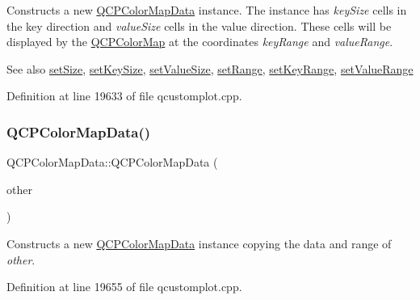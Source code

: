 Constructs a new \hyperlink{class_q_c_p_color_map_data}{Q\+C\+P\+Color\+Map\+Data} instance. The instance has {\itshape key\+Size} cells in the key direction and {\itshape value\+Size} cells in the value direction. These cells will be displayed by the \hyperlink{class_q_c_p_color_map}{Q\+C\+P\+Color\+Map} at the coordinates {\itshape key\+Range} and {\itshape value\+Range}.

\begin{DoxySeeAlso}{See also}
\hyperlink{class_q_c_p_color_map_data_a0d9ff35c299d0478b682bfbcdd9c097e}{set\+Size}, \hyperlink{class_q_c_p_color_map_data_ac7ef70e383aface34b44dbde49234b6b}{set\+Key\+Size}, \hyperlink{class_q_c_p_color_map_data_a0893c9e3914513048b45e3429ffd16f2}{set\+Value\+Size}, \hyperlink{class_q_c_p_color_map_data_aad9c1c7c703c1339489fc730517c83d4}{set\+Range}, \hyperlink{class_q_c_p_color_map_data_a0738c485f3c9df9ea1241b7a8bb6a86e}{set\+Key\+Range}, \hyperlink{class_q_c_p_color_map_data_ada1b2680ba96a5f4175b6d341cf75d23}{set\+Value\+Range} 
\end{DoxySeeAlso}


Definition at line 19633 of file qcustomplot.\+cpp.

\mbox{\label{class_q_c_p_color_map_data_a7f2145d86473263494abb9bf1de20436}} 
\subsubsection{\texorpdfstring{Q\+C\+P\+Color\+Map\+Data()}{QCPColorMapData()}\hspace{0.1cm}{\footnotesize\ttfamily [2/2]}}
{\footnotesize\ttfamily Q\+C\+P\+Color\+Map\+Data\+::\+Q\+C\+P\+Color\+Map\+Data (\begin{DoxyParamCaption}\item[{const \hyperlink{class_q_c_p_color_map_data}{Q\+C\+P\+Color\+Map\+Data} \&}]{other }\end{DoxyParamCaption})}

Constructs a new \hyperlink{class_q_c_p_color_map_data}{Q\+C\+P\+Color\+Map\+Data} instance copying the data and range of {\itshape other}. 

Definition at line 19655 of file qcustomplot.\+cpp.



